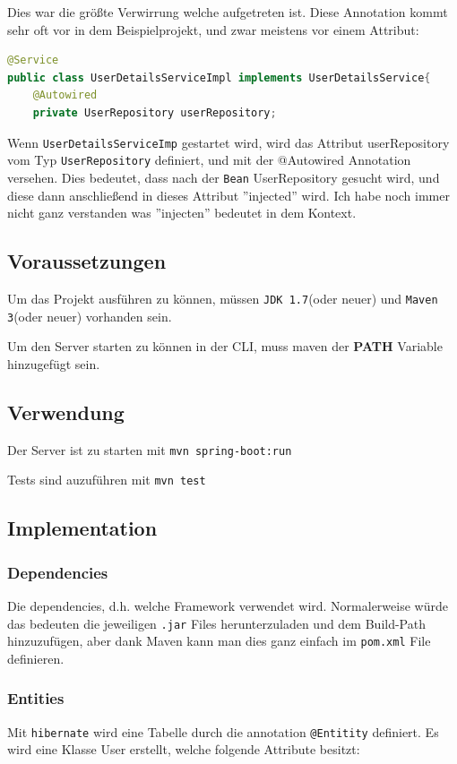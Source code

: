 Dies war die größte Verwirrung welche aufgetreten ist. Diese Annotation kommt sehr oft vor in dem Beispielprojekt, und zwar meistens vor einem Attribut:

\begin{lstlisting}[language=Java]
@Service
public class UserDetailsServiceImpl implements UserDetailsService{
	@Autowired
	private UserRepository userRepository;
\end{lstlisting}

Wenn \verb|UserDetailsServiceImp| gestartet wird, wird das Attribut userRepository vom Typ \verb|UserRepository| definiert, und mit der @Autowired Annotation versehen. Dies bedeutet, dass nach der \verb|Bean| UserRepository gesucht wird, und diese dann anschließend in dieses Attribut ''injected'' wird. Ich habe noch immer nicht ganz verstanden was ''injecten'' bedeutet in dem Kontext. 

\subsection{Voraussetzungen}
Um das Projekt ausführen zu können, müssen \verb|JDK 1.7|(oder neuer) und \verb|Maven 3|(oder neuer) vorhanden sein.

Um den Server starten zu können in der CLI, muss maven der \textbf{PATH} Variable hinzugefügt sein.

\subsection{Verwendung}
Der Server ist zu starten mit \verb|mvn spring-boot:run|

Tests sind auzuführen mit \verb|mvn test|

\subsection{Implementation}

\subsubsection{Dependencies}
Die dependencies, d.h. welche Framework verwendet wird. Normalerweise würde das bedeuten die jeweiligen \verb|.jar| Files herunterzuladen und dem Build-Path hinzuzufügen, aber dank Maven kann man dies ganz einfach im \verb|pom.xml| File definieren.

\subsubsection{Entities}
Mit \verb|hibernate| wird eine Tabelle durch die annotation \verb|@Entitity| definiert. Es wird eine Klasse User erstellt, welche folgende Attribute besitzt:

